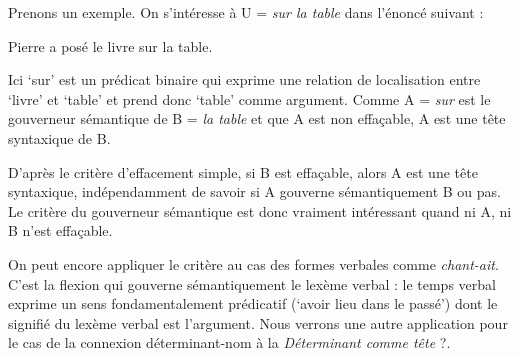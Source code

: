 Prenons un exemple. On s’intéresse à U = \textit{sur la table} dans l’énoncé suivant :

\ea Pierre a posé le livre sur la table.\z

Ici ‘sur’ est un prédicat binaire qui exprime une relation de localisation entre ‘livre’ et ‘table’ et prend donc ‘table’ comme argument. Comme A = \textit{sur} est le gouverneur sémantique de B = \textit{la table} et que A est non effaçable, A est une tête syntaxique de B.

D’après le critère d’effacement simple, si B est effaçable, alors A est une tête syntaxique, indépendamment de savoir si A gouverne sémantiquement B ou pas. Le critère du gouverneur sémantique est donc vraiment intéressant quand ni A, ni B n’est effaçable.

On peut encore appliquer le critère au cas des formes verbales comme \textit{chant-ait}. C’est la flexion qui gouverne sémantiquement le lexème verbal : le temps verbal exprime un sens fondamentalement prédicatif (‘avoir lieu dans le passé’) dont le signifié du lexème verbal est l’argument. Nous verrons une autre application pour le cas de la connexion déterminant-nom à la  \textit{Déterminant comme tête} ?.

